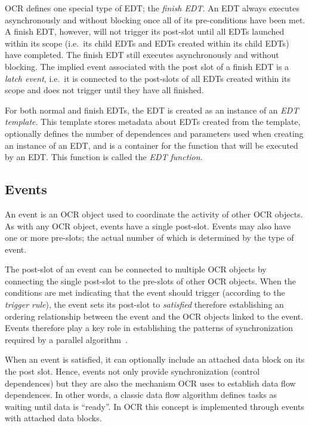 OCR defines one special type of EDT; the \emph{finish
EDT}. An EDT always executes asynchronously and
without blocking once all of its pre-conditions have been met. A
finish EDT, however, will not trigger its post-slot until all EDTs
launched within its scope (i.e.\ its child EDTs and EDTs created
within its child EDTs) have completed.  The finish EDT still executes
asynchronously and without blocking. The implied event associated with
the post slot of a finish EDT is a \emph{latch event}, i.e.\ it is
connected to the post-slots of all EDTs created within its scope and
does not trigger until they have all finished.

For both normal and finish EDTs, the EDT is created as an
instance of  an \emph{EDT template}. This template stores metadata about EDTs created from the
template, optionally defines the number of dependences and parameters
used when creating an instance of an EDT, and is a container for the
function that will be executed by an EDT. This function is called the
\emph{EDT function}.

\subsection{Events}
\label{sec:Event}

An event is an OCR object used to coordinate the activity of other OCR
objects. As with any OCR object, events have a single
post-slot. Events may also have one or more pre-slots; the actual
number of which is determined by the type of event.

The post-slot of an event can be connected to multiple OCR objects by
connecting the single post-slot to the pre-slots of other OCR objects.
When the conditions are met indicating that the event should trigger
(according to the \emph{trigger rule}), the event
sets its post-slot to \emph{satisfied} therefore establishing an
ordering relationship between the event and the OCR objects linked to
the event. Events therefore play a key role in establishing the
patterns of synchronization required by a parallel
algorithm~\cite{ImSa14-2}.

When an event is satisfied, it can optionally include an attached data block on its
the post slot. Hence, events not only provide synchronization
(control dependences) but they are also the mechanism OCR uses to
establish data flow dependences. In other words, a classic data flow
algorithm defines tasks as waiting until data is ``ready''. In OCR
this concept is implemented through events with attached data blocks.

